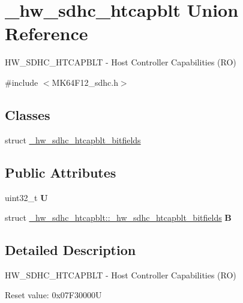 \hypertarget{union__hw__sdhc__htcapblt}{}\section{\+\_\+hw\+\_\+sdhc\+\_\+htcapblt Union Reference}
\label{union__hw__sdhc__htcapblt}


H\+W\+\_\+\+S\+D\+H\+C\+\_\+\+H\+T\+C\+A\+P\+B\+LT -\/ Host Controller Capabilities (RO)  




{\ttfamily \#include $<$M\+K64\+F12\+\_\+sdhc.\+h$>$}

\subsection*{Classes}
\begin{DoxyCompactItemize}
\item 
struct \hyperlink{struct__hw__sdhc__htcapblt_1_1__hw__sdhc__htcapblt__bitfields}{\+\_\+hw\+\_\+sdhc\+\_\+htcapblt\+\_\+bitfields}
\end{DoxyCompactItemize}
\subsection*{Public Attributes}
\begin{DoxyCompactItemize}
\item 
uint32\+\_\+t {\bfseries U}\hypertarget{union__hw__sdhc__htcapblt_a0d737f4c4eb4561b196dbe5e657107db}{}\label{union__hw__sdhc__htcapblt_a0d737f4c4eb4561b196dbe5e657107db}

\item 
struct \hyperlink{struct__hw__sdhc__htcapblt_1_1__hw__sdhc__htcapblt__bitfields}{\+\_\+hw\+\_\+sdhc\+\_\+htcapblt\+::\+\_\+hw\+\_\+sdhc\+\_\+htcapblt\+\_\+bitfields} {\bfseries B}\hypertarget{union__hw__sdhc__htcapblt_a24cc4fdc8cd0bc94a1fbeebb6db49189}{}\label{union__hw__sdhc__htcapblt_a24cc4fdc8cd0bc94a1fbeebb6db49189}

\end{DoxyCompactItemize}


\subsection{Detailed Description}
H\+W\+\_\+\+S\+D\+H\+C\+\_\+\+H\+T\+C\+A\+P\+B\+LT -\/ Host Controller Capabilities (RO) 

Reset value\+: 0x07\+F30000U

